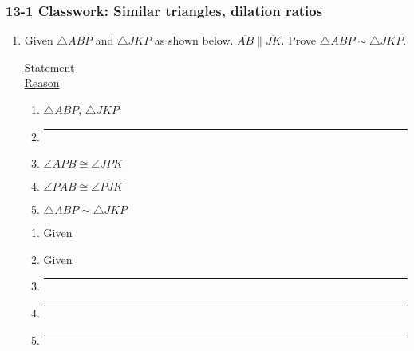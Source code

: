 \documentclass[12pt, twoside]{article}
\begin{document}
\subsubsection*{13-1 Classwork: Similar triangles, dilation ratios}
 \begin{enumerate}

   \item Given $\triangle ABP$ and $\triangle JKP$ as shown below. $\overline{AB} \parallel \overline{JK}$. Prove $\triangle ABP \sim \triangle JKP$.\\[0.5cm]

     \begin{multicols}{2}
       \underline{Statement} \\
       \underline{Reason}
     \end{multicols}
     \begin{multicols}{2}
       \raggedcolumns
       \begin{enumerate}[label={\arabic*)}]
         \item $\triangle ABP$, $\triangle JKP$ \vspace{0.3cm}
         \item \rule{4cm}{0.15mm} \vspace{0.3cm}
         \item $\angle APB \cong \angle JPK$  \vspace{0.3cm}
         \item $\angle PAB \cong \angle PJK$ \vspace{0.3cm}
         \item $\triangle ABP \sim \triangle JKP$ \vspace{0.3cm}
       \end{enumerate}
       \begin{enumerate}[label={\arabic*)}]
         \item Given \vspace{0.3cm}
         \item Given \vspace{0.3cm}
         \item \rule{4cm}{0.15mm} \vspace{0.3cm}
         \item \rule{4cm}{0.15mm} \vspace{0.3cm}
         \item \rule{4cm}{0.15mm} \vspace{0.3cm}
       \end{enumerate}
     \end{multicols}


\end{enumerate}
\end{document}
